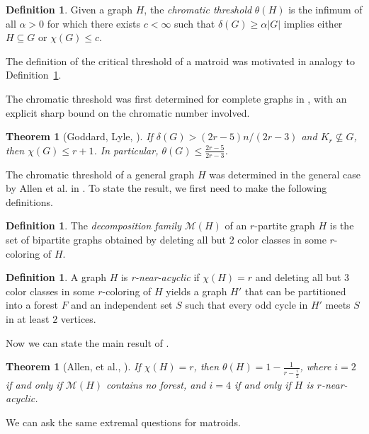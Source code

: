 \documentclass{article}
\theoremstyle{plain}
\newtheorem{thm}[theorem]{Theorem}
\theoremstyle{definition}
\theoremstyle{definition}
\newtheorem{defn}[theorem]{Definition}
\theoremstyle{remark}
\numberwithin{equation}{section}
\begin{document}
\begin{defn}
\label{def:chromthresh}
Given a graph $H$, the \emph{chromatic threshold} $\theta(H)$ is the infimum of all $\alpha>0$ for which there exists $c<\infty$ such that $\delta(G)\geq \alpha |G|$ implies either $H\subseteq G$ or $\chi(G)\leq c$.
\end{defn}

The definition of the critical threshold of a matroid was motivated in analogy to Definition~\ref{def:chromthresh}.

The chromatic threshold was first determined for complete graphs in \cite{KnFree}, with an explicit sharp bound on the chromatic number involved.

\begin{thm}[Goddard, Lyle, {\cite[Thm~11]{KnFree}}]
If $\delta(G)>(2r-5)n/(2r-3)$ and $K_r\not\subseteq G$, then $\chi(G)\leq r+1$. In particular, $\theta(G)\leq \frac{2r-5}{2r-3}$.
\end{thm}

The chromatic threshold of a general graph $H$ was determined in the general case by Allen et al. in \cite{chromThresh}. To state the result, we first need to make the following definitions.

\begin{defn}
The \emph{decomposition family} $\mathcal{M}(H)$ of an $r$-partite graph $H$ is the set of bipartite graphs obtained by deleting all but $2$ color classes in some $r$-coloring of $H$.
\end{defn}

\begin{defn}
A graph $H$ is \emph{r-near-acyclic} if $\chi(H)=r$ and deleting all but $3$ color classes in some $r$-coloring of $H$ yields a graph $H'$ that can be partitioned into a forest $F$ and an independent set $S$ such that every odd cycle in $H'$ meets $S$ in at least $2$ vertices.
\end{defn}

Now we can state the main result of \cite{chromThresh}.

\begin{thm}[Allen, et al., {\cite[Thm~2]{chromThresh}}]
\label{thm:chromThresh}
If $\chi(H)=r$, then $\theta(H)=1-\frac{1}{r-\frac{i}{2}}$, where $i=2$ if and only if $\mathcal{M}(H)$ contains no forest, and $i=4$ if and only if $H$ is $r$-near-acyclic.
\end{thm}

\label{sec:matrBack}

We can ask the same extremal questions for matroids.
\end{document}
